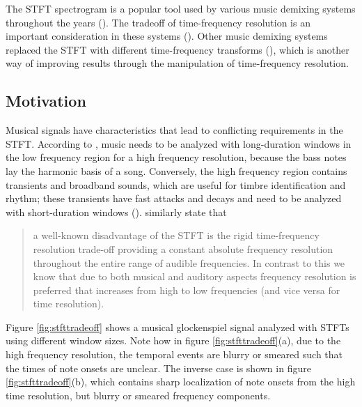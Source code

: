 \documentclass[report.tex]{subfiles}
\begin{document}
The STFT spectrogram is a popular tool used by various music demixing systems throughout the years (\cite{musicsepgood, musicsepsurvey, sisec2018, fitzgerald1, umx, plumbley1, plumbley2}). The tradeoff of time-frequency resolution is an important consideration in these systems (\cite{tftradeoff1, tftradeoff2}). Other music demixing systems replaced the STFT with different time-frequency transforms (\cite{fitzgerald2, cqtseparation, bettermusicsep}), which is another way of improving results through the manipulation of time-frequency resolution.

\subsection{Motivation}

Musical signals have characteristics that lead to conflicting requirements in the STFT. According to \textcite{doerflerphd}, music needs to be analyzed with long-duration windows in the low frequency region for a high frequency resolution, because the bass notes lay the harmonic basis of a song. Conversely, the high frequency region contains transients and broadband sounds, which are useful for timbre identification and rhythm; these transients have fast attacks and decays and need to be analyzed with short-duration windows (\cite{doerflerphd}). \textcite{cqtransient} similarly state that

\begin{quote}
	a well-known disadvantage of the STFT is the rigid time-frequency resolution trade-off providing a constant absolute frequency resolution throughout the entire range of audible frequencies. In contrast to this we know that due to both musical and auditory aspects frequency resolution is preferred that increases from high to low frequencies (and vice versa for time resolution).
\end{quote}

Figure \ref{fig:stfttradeoff} shows a musical glockenspiel signal analyzed with STFTs using different window sizes. Note how in figure \ref{fig:stfttradeoff}(a), due to the high frequency resolution, the temporal events are blurry or smeared such that the times of note onsets are unclear. The inverse case is shown in figure \ref{fig:stfttradeoff}(b), which contains sharp localization of note onsets from the high time resolution, but blurry or smeared frequency components.
\end{document}
